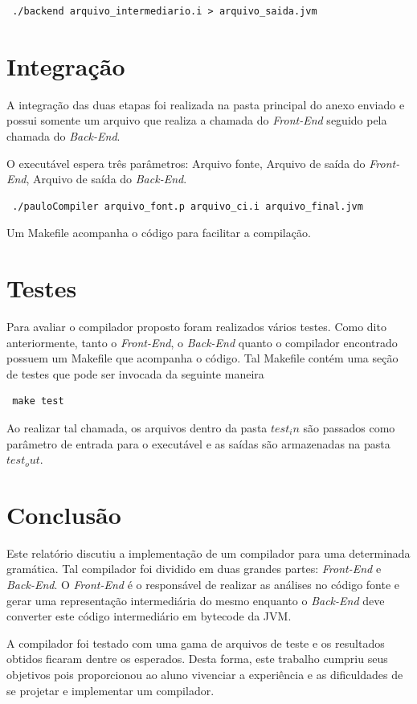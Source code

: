 \documentclass[12pt]{article}
\begin{document}
\begin{verbatim}
 ./backend arquivo_intermediario.i > arquivo_saida.jvm
\end{verbatim}


\section{Integração}

A integração das duas etapas foi realizada na pasta principal do anexo enviado e possui somente um arquivo que realiza a chamada do \textit{Front-End} seguido pela chamada do \textit{Back-End}.

O executável espera três parâmetros: Arquivo fonte, Arquivo de saída do \textit{Front-End}, Arquivo de saída do \textit{Back-End}.

\begin{verbatim}
 ./pauloCompiler arquivo_font.p arquivo_ci.i arquivo_final.jvm
\end{verbatim}

Um Makefile acompanha o código para facilitar a compilação.


\section{Testes}

Para avaliar o compilador proposto foram realizados vários testes. Como dito anteriormente, tanto o \textit{Front-End}, o \textit{Back-End} quanto o compilador encontrado possuem um Makefile que acompanha o código. Tal Makefile contém uma seção de testes que pode ser invocada da seguinte maneira

\begin{verbatim}
 make test
\end{verbatim}

Ao realizar tal chamada, os arquivos dentro da pasta $test_in$ são passados como parâmetro de entrada para o executável e as saídas são armazenadas na pasta $test_out$.


\section{Conclusão}

Este relatório discutiu a implementação de um compilador para uma determinada gramática. Tal compilador foi dividido em duas grandes partes: \textit{Front-End} e \textit{Back-End}. O \textit{Front-End} é o responsável de realizar as análises no código fonte e gerar uma representação intermediária do mesmo enquanto o \textit{Back-End} deve converter este código intermediário em bytecode da JVM.

A compilador foi testado com uma gama de arquivos de teste e os resultados obtidos ficaram dentre os esperados. Desta forma, este trabalho cumpriu seus objetivos pois proporcionou ao aluno vivenciar a experiência e as dificuldades de se projetar e implementar um compilador.




\end{document}
